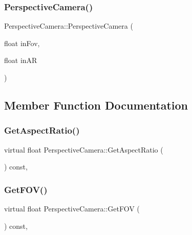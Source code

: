 \subsubsection{\texorpdfstring{Perspective\+Camera()}{PerspectiveCamera()}}
{\footnotesize\ttfamily Perspective\+Camera\+::\+Perspective\+Camera (\begin{DoxyParamCaption}\item[{float}]{in\+Fov,  }\item[{float}]{in\+AR }\end{DoxyParamCaption})}



\subsection{Member Function Documentation}
\hypertarget{class_perspective_camera_a87fb95ff5289f9bb8658c33ed710ec17}{}\label{class_perspective_camera_a87fb95ff5289f9bb8658c33ed710ec17}
\subsubsection{\texorpdfstring{Get\+Aspect\+Ratio()}{GetAspectRatio()}}
{\footnotesize\ttfamily virtual float Perspective\+Camera\+::\+Get\+Aspect\+Ratio (\begin{DoxyParamCaption}{ }\end{DoxyParamCaption}) const\hspace{0.3cm}{\ttfamily [inline]}, {\ttfamily [virtual]}}

\hypertarget{class_perspective_camera_a04749345688970ec94fb26817bab10be}{}\label{class_perspective_camera_a04749345688970ec94fb26817bab10be}
\subsubsection{\texorpdfstring{Get\+F\+O\+V()}{GetFOV()}}
{\footnotesize\ttfamily virtual float Perspective\+Camera\+::\+Get\+F\+OV (\begin{DoxyParamCaption}{ }\end{DoxyParamCaption}) const\hspace{0.3cm}{\ttfamily [inline]}, {\ttfamily [virtual]}}



